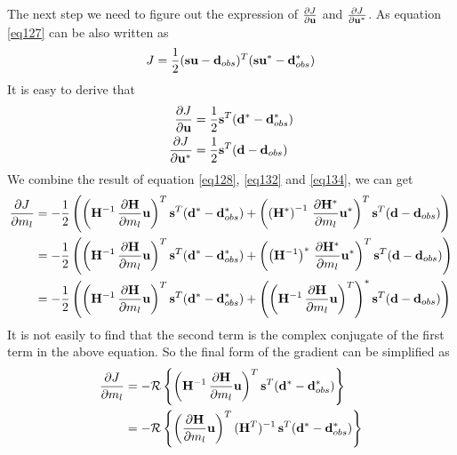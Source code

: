 \documentclass[revised,endfloat]{geophysics}
\begin{document}
The next step we need to figure out the expression of $\frac{\partial J}{\partial {\bf u}}$ and $\frac{\partial J}{\partial {\bf u}^*}$. As equation \ref{eq127} can be also written as
\begin{equation}
J = \frac{1}{2}({\bf s}{\bf u} - {\bf d}_{obs})^T ({\bf s}{\bf u}^* - {\bf d}_{obs}^*)
\label{eq133}
\end{equation}
It is easy to derive that
\begin{equation}
\begin{split}
\frac{\partial J}{\partial {\bf u}} & = \frac{1}{2} {\bf s}^T ({\bf d}^* - {\bf d}_{obs}^*) \\
\frac{\partial J}{\partial {\bf u}^*} & = \frac{1}{2} {\bf s}^T ({\bf d} - {\bf d}_{obs}) \\
\end{split}
\label{eq134}
\end{equation}
We combine the result of equation \ref{eq128}, \ref{eq132} and \ref{eq134}, we can get
\begin{equation}
\begin{split}
\frac{\partial J}{\partial m_l} &= -\frac{1}{2} \left(    \left({\bf H}^{-1} \,\frac{\partial {\bf H}}{\partial m_l} {\bf u}\right)^T {\bf s}^T ({\bf d}^* - {\bf d}_{obs}^*)  + \left( \left({\bf H}^*\right)^{-1}  \, \frac{\partial {\bf H}^*}{\partial m_l} {\bf u}^*\right)^T  {\bf s}^T ({\bf d} - {\bf d}_{obs})   \right) \\
 &= -\frac{1}{2} \left(    \left({\bf H}^{-1} \,\frac{\partial {\bf H}}{\partial m_l} {\bf u}\right)^T {\bf s}^T ({\bf d}^* - {\bf d}_{obs}^*)  + \left( \left({\bf H}^{-1}\right)^*  \, \frac{\partial {\bf H}^*}{\partial m_l} {\bf u}^*\right)^T  {\bf s}^T ({\bf d} - {\bf d}_{obs})   \right) \\
  &= -\frac{1}{2} \left(    \left({\bf H}^{-1} \,\frac{\partial {\bf H}}{\partial m_l} {\bf u}\right)^T {\bf s}^T ({\bf d}^* - {\bf d}_{obs}^*)  + \left( \left( {\bf H}^{-1}  \, \frac{\partial {\bf H}}{\partial m_l} {\bf u} \right)^T \right)^* {\bf s}^T ({\bf d} - {\bf d}_{obs})   \right)
\end{split}
\label{eq135}
\end{equation}
It is not easily to find that the second term is the complex conjugate of the first term in the above equation. So the final form of the gradient can be simplified as
\begin{equation}
\begin{split}
\frac{\partial J}{\partial m_l} &= -{\mathcal R} \left\{    \left({\bf H}^{-1} \,\frac{\partial {\bf H}}{\partial m_l} {\bf u}\right)^T {\bf s}^T ({\bf d}^* - {\bf d}_{obs}^*)  \right\} \\
&= -{\mathcal R} \left\{  \left( \frac{\partial {\bf H}}{\partial m_l} {\bf u} \right)^T  ({\bf H}^T)^{-1} \,    {\bf s}^T ({\bf d}^* - {\bf d}_{obs}^*)  \right\} \\
\end{split}
\label{eq136}
\end{equation}
\end{document}
